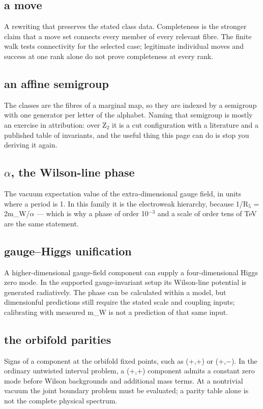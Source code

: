 \documentclass[11pt,a4paper]{article}
\begin{document}
\subsection*{a move}
A rewriting that preserves the stated class data. Completeness is the stronger claim that a move set connects every member of every relevant fibre. The finite walk tests connectivity for the selected case; legitimate individual moves and success at one rank alone do not prove completeness at every rank.

\subsection*{an affine semigroup}
The classes are the fibres of a marginal map, so they are indexed by a semigroup with one generator per letter of the alphabet. Naming that semigroup is mostly an exercise in attribution: over Z\ensuremath{{}_{2}} it is a cut configuration with a literature and a published table of invariants, and the useful thing this page can do is stop you deriving it again.

\subsection*{\ensuremath{\alpha}, the Wilson-line phase}
The vacuum expectation value of the extra-dimensional gauge field, in units where a period is 1. In this family it is the electroweak hierarchy, because 1/R\ensuremath{{}_{5}} = 2m\_W/\ensuremath{\alpha} --- which is why a phase of order 10\ensuremath{{}^{-3}} and a scale of order tens of TeV are the same statement.

\subsection*{gauge--Higgs unification}
A higher-dimensional gauge-field component can supply a four-dimensional Higgs zero mode. In the supported gauge-invariant setup its Wilson-line potential is generated radiatively. The phase can be calculated within a model, but dimensionful predictions still require the stated scale and coupling inputs; calibrating with measured m\_W is not a prediction of that same input.

\subsection*{the orbifold parities}
Signs of a component at the orbifold fixed points, such as (+,+) or (+,\ensuremath{-}). In the ordinary untwisted interval problem, a (+,+) component admits a constant zero mode before Wilson backgrounds and additional mass terms. At a nontrivial vacuum the joint boundary problem must be evaluated; a parity table alone is not the complete physical spectrum.
\end{document}
